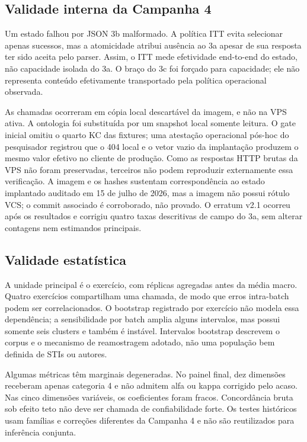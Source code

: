 \documentclass[11pt,a4paper]{article}
\newcommand{\ITT}{ITT}
\begin{document}
\subsection{Validade interna da Campanha 4}

Um estado falhou por JSON 3b malformado. A política \ITT{} evita selecionar apenas sucessos, mas a atomicidade atribui ausência ao 3a apesar de sua resposta ter sido aceita pelo parser. Assim, o \ITT{} mede efetividade end-to-end do estado, não capacidade isolada do 3a. O braço do 3c foi forçado para capacidade; ele não representa conteúdo efetivamente transportado pela política operacional observada.

As chamadas ocorreram em cópia local descartável da imagem, e não na VPS ativa. A ontologia foi substituída por um snapshot local somente leitura. O gate inicial omitiu o quarto KC das fixtures; uma atestação operacional pós-hoc do pesquisador registrou que o 404 local e o vetor vazio da implantação produzem o mesmo valor efetivo no cliente de produção. Como as respostas HTTP brutas da VPS não foram preservadas, terceiros não podem reproduzir externamente essa verificação. A imagem e os hashes sustentam correspondência ao estado implantado auditado em 15 de julho de 2026, mas a imagem não possui rótulo VCS; o commit associado é corroborado, não provado. O erratum v2.1 ocorreu após os resultados e corrigiu quatro taxas descritivas de campo do 3a, sem alterar contagens nem estimandos principais.

\subsection{Validade estatística}

A unidade principal é o exercício, com réplicas agregadas antes da média macro. Quatro exercícios compartilham uma chamada, de modo que erros intra-batch podem ser correlacionados. O bootstrap registrado por exercício não modela essa dependência; a sensibilidade por batch amplia alguns intervalos, mas possui somente seis clusters e também é instável. Intervalos bootstrap descrevem o corpus e o mecanismo de reamostragem adotado, não uma população bem definida de STIs ou autores.

Algumas métricas têm marginais degeneradas. No painel final, dez dimensões receberam apenas categoria 4 e não admitem alfa ou kappa corrigido pelo acaso. Nas cinco dimensões variáveis, os coeficientes foram fracos. Concordância bruta sob efeito teto não deve ser chamada de confiabilidade forte. Os testes históricos usam famílias e correções diferentes da Campanha 4 e não são reutilizados para inferência conjunta.
\end{document}
